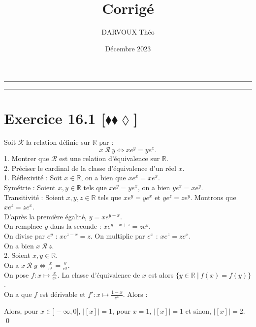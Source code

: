 \documentclass[10pt]{article}
\title{\bf{\pagetitle}\\\large{Corrigé}}
\date{Décembre 2023}
\author{DARVOUX Théo}
\def\pagetitle{Relations Binaires}
\begin{document}
\renewcommand*\contentsname{Exercices.}
\renewcommand*{\cftsecleader}{\cftdotfill{\cftdotsep}}
\maketitle

\hrule
\tableofcontents
\vspace{0.5cm}
\hrule

\thispagestyle{fancy}
\fancyhead[C]{\pagetitle}
\allowdisplaybreaks

\pagebreak


\section*{Exercice 16.1 [$\blacklozenge\blacklozenge\lozenge$]}
\begin{tcolorbox}[enhanced, width=7.6in, center, size=fbox, fontupper=\large, drop shadow southwest]
    Soit $\mathcal{R}$ la relation définie sur $\mathbb{R}$ par :
    \begin{equation*}
        x ~\mathcal{R} ~ y \iff xe^y = ye^x.
    \end{equation*}
    1. Montrer que $\mathcal{R}$ est une relation d'équivalence sur $\mathbb{R}$.\\
    2. Préciser le cardinal de la classe d'équivalence d'un réel $x$.\\[0.1cm]
    1. Réflexivité : Soit $x\in\mathbb{R}$, on a bien que $xe^x = xe^x$.\\
    Symétrie : Soient $x,y\in\mathbb{R}$ tels que $xe^y = ye^x$, on a bien $ye^x = xe^y$.\\
    Transitivité : Soient $x,y,z\in\mathbb{R}$ tels que $xe^y = ye^x$ et $ye^z = ze^y$. Montrons que $xe^z = ze^x$.\\
    D'après la première égalité, $y=xe^{y-x}$.\\
    On remplace $y$ dans la seconde : $xe^{y-x+z}=ze^y$.\\
    On divise par $e^y$ : $xe^{z-x}=z$. On multiplie par $e^x$ : $xe^z = ze^x$.\\
    On a bien $x ~ \mathcal{R} ~ z$.\\[0.2cm]
    2. Soient $x,y\in\mathbb{R}$.\\
    On a $x ~ \mathcal{R} ~ y \iff \frac{x}{e^x} = \frac{y}{e^y}$.\\
    On pose $f:x\mapsto \frac{x}{e^x}$. La classe d'équivalence de $x$ est alors $\{y\in\mathbb{R} ~ | ~ f(x) = f(y)\}$.\\
    On a que $f$ est dérivable et $f':x\mapsto \frac{1-x}{e^{x}}$. Alors :
    \begin{center}
    \end{center}
    Alors, pour $x\in]-\infty,0]$, $|[x]|=1$, pour $x=1$, $|[x]|=1$ et sinon, $|[x]|=2$.\\
    \qed
\end{tcolorbox}
\end{document}
